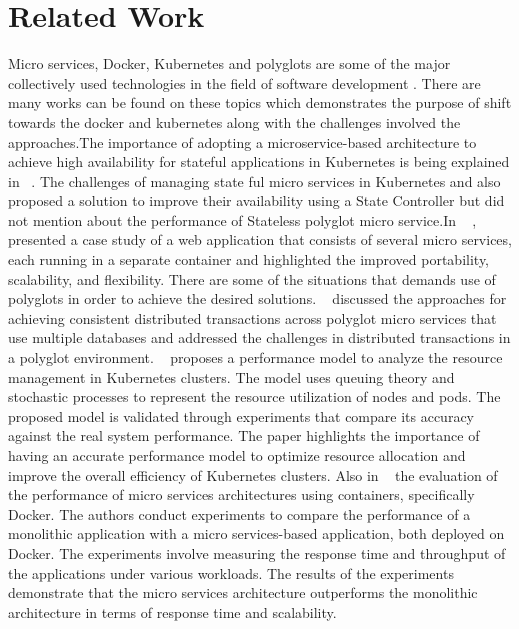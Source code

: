 \section{Related Work}
Micro services, Docker, Kubernetes and polyglots are some of the major collectively used technologies in the field of software development . There are many works can be found on these topics which demonstrates the purpose of shift towards the docker and kubernetes along with the challenges involved the approaches.The importance of adopting a microservice-based architecture to achieve high availability for stateful applications in Kubernetes is being explained in    ~\cite{vayghan2019microservice}. The challenges of managing state ful micro services in Kubernetes and also proposed a solution to improve their availability using a State Controller but did not mention about the performance of Stateless polyglot micro service.In ~\cite{sharma2020docker} , presented a case study of a web application that consists of several micro services, each running in a separate container and highlighted the  improved portability, scalability, and flexibility. There are some of the situations that demands use of polyglots in order to achieve the desired solutions. ~\cite{zhang2019grit} discussed the approaches for achieving consistent distributed transactions across polyglot micro services that use multiple databases and addressed the challenges in distributed transactions in a polyglot environment. ~\cite{medel2016modelling} proposes a performance model to analyze the resource management in Kubernetes clusters. The model uses queuing theory and stochastic processes to represent the resource utilization of nodes and pods. The proposed model is validated through experiments that compare its accuracy against the real system performance. The paper highlights the importance of having an accurate performance model to optimize resource allocation and improve the overall efficiency of Kubernetes clusters. Also in ~\cite{amaral2015performance} the evaluation of the performance of micro services architectures using containers, specifically Docker. The authors conduct experiments to compare the performance of a monolithic application with a micro services-based application, both deployed on Docker. The experiments involve measuring the response time and throughput of the applications under various workloads. The results of the experiments demonstrate that the micro services architecture outperforms the monolithic architecture in terms of response time and scalability. 
